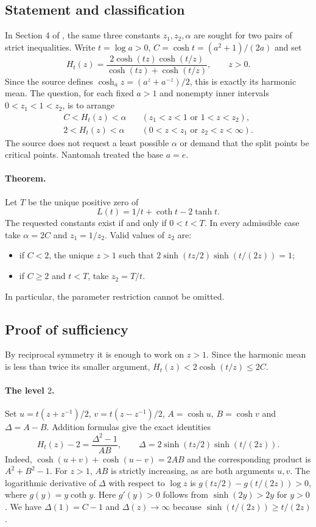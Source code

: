 \documentclass[11pt,a4paper]{article}
\numberwithin{equation}{section}
\theoremstyle{definition}
\theoremstyle{remark}
\begin{document}
\subsection{Statement and classification}
In Section 4 of \cite{r29meiji:LQ}, the same three constants $z_1,z_2,\alpha$ are sought for two pairs of strict inequalities. Write $t=\log a>0$, $C=\cosh t=(a^2+1)/(2a)$ and set
\[
 H_t(z)=\frac{2\cosh(tz)\cosh(t/z)}{\cosh(tz)+\cosh(t/z)},\qquad z>0.
\]
Since the source defines $\cosh_a z=(a^z+a^{-z})/2$, this is exactly its harmonic mean. The question, for each fixed $a>1$ and nonempty inner intervals $0<z_1<1<z_2$, is to arrange
\begin{align*}
 C < H_t(z)<\alpha &\quad (z_1<z<1\text{ or }1<z<z_2),\\
 2 < H_t(z)<\alpha &\quad (0<z<z_1\text{ or }z_2<z<\infty).
\end{align*}
The source does not request a least possible $\alpha$ or demand that the split points be critical points. Nantomah \cite[Thm.~2.6]{r29meiji:N} treated the base $a=e$.
\paragraph{Theorem.} Let $T$ be the unique positive zero of
\[
 L(t)=1/t+\coth t-2\tanh t .
\]
The requested constants exist if and only if $0<t<T$. In every admissible case take $\alpha=2C$ and $z_1=1/z_2$. Valid values of $z_2$ are:
\begin{itemize}
\item if $C<2$, the unique $z>1$ such that $2\sinh(tz/2)\sinh(t/(2z))=1$;
\item if $C\ge2$ and $t<T$, take $z_2=T/t$.
\end{itemize}
In particular, the parameter restriction cannot be omitted.

\subsection{Proof of sufficiency}
By reciprocal symmetry it is enough to work on $z>1$. Since the harmonic mean is less than twice its smaller argument, $H_t(z)<2\cosh(t/z)\le2C$.

\paragraph{The level $2$.}
Set $u=t(z+z^{-1})/2$, $v=t(z-z^{-1})/2$, $A=\cosh u$, $B=\cosh v$ and $\Delta=A-B$. Addition formulas give the exact identities
\begin{equation*}
 H_t(z)-2=\frac{\Delta^2-1}{AB},\qquad
 \Delta=2\sinh(tz/2)\sinh(t/(2z)).
\end{equation*}
Indeed, $\cosh(u+v)+\cosh(u-v)=2AB$ and the corresponding product is $A^2+B^2-1$. For $z>1$, $AB$ is strictly increasing, as are both arguments $u,v$. The logarithmic derivative of $\Delta$ with respect to $\log z$ is $g(tz/2)-g(t/(2z))>0$, where $g(y)=y\coth y$. Here $g'(y)>0$ follows from $\sinh(2y)>2y$ for $y>0$. We have $\Delta(1)=C-1$ and $\Delta(z)\to\infty$ because $\sinh(t/(2z))\ge t/(2z)$.
\end{document}
